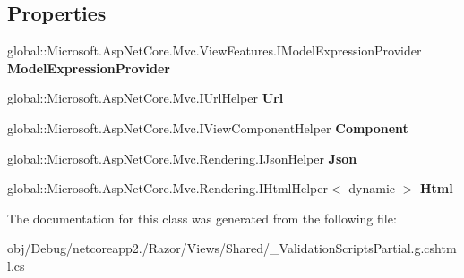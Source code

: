 \subsection*{Properties}
\begin{DoxyCompactItemize}
\item 
\mbox{\label{class_asp_net_core_1_1_views___shared_____validation_scripts_partial_aa202649b0aff57509d9652ddbf98b677}} 
global\+::\+Microsoft.\+Asp\+Net\+Core.\+Mvc.\+View\+Features.\+I\+Model\+Expression\+Provider {\bfseries Model\+Expression\+Provider}
\item 
\mbox{\label{class_asp_net_core_1_1_views___shared_____validation_scripts_partial_a69eafabffc0edbd39b0d850222b941a2}} 
global\+::\+Microsoft.\+Asp\+Net\+Core.\+Mvc.\+I\+Url\+Helper {\bfseries Url}
\item 
\mbox{\label{class_asp_net_core_1_1_views___shared_____validation_scripts_partial_a2eecdf72cc8131f34209354546b62bf7}} 
global\+::\+Microsoft.\+Asp\+Net\+Core.\+Mvc.\+I\+View\+Component\+Helper {\bfseries Component}
\item 
\mbox{\label{class_asp_net_core_1_1_views___shared_____validation_scripts_partial_a0a9241c45ac11aaca239b65302d74349}} 
global\+::\+Microsoft.\+Asp\+Net\+Core.\+Mvc.\+Rendering.\+I\+Json\+Helper {\bfseries Json}
\item 
\mbox{\label{class_asp_net_core_1_1_views___shared_____validation_scripts_partial_ac3e986c2c47b589e598c7b0b7a78ccc6}} 
global\+::\+Microsoft.\+Asp\+Net\+Core.\+Mvc.\+Rendering.\+I\+Html\+Helper$<$ dynamic $>$ {\bfseries Html}
\end{DoxyCompactItemize}


The documentation for this class was generated from the following file\+:\begin{DoxyCompactItemize}
\item 
obj/\+Debug/netcoreapp2./\+Razor/\+Views/\+Shared/\+\_\+\+Validation\+Scripts\+Partial.\+g.\+cshtml.\+cs\end{DoxyCompactItemize}
